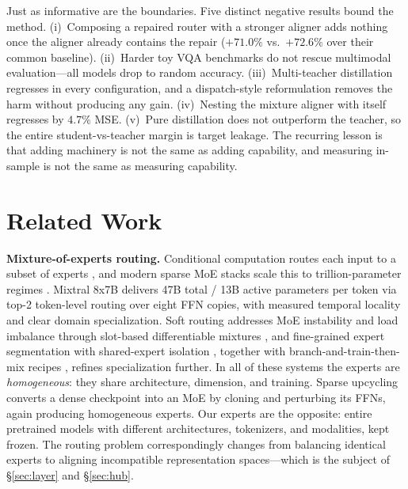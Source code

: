 \documentclass[10pt,twoside]{article}
\theoremstyle{definition}
\theoremstyle{plain}
\theoremstyle{remark}
\begin{document}
Just as informative are the boundaries. Five distinct negative results bound the method. (i)~Composing a repaired router with a stronger aligner adds nothing once the aligner already contains the repair ($+71.0\%$ vs.\ $+72.6\%$ over their common baseline). (ii)~Harder toy VQA benchmarks do not rescue multimodal evaluation---all models drop to random accuracy. (iii)~Multi-teacher distillation regresses in every configuration, and a dispatch-style reformulation removes the harm without producing any gain. (iv)~Nesting the mixture aligner with itself regresses by $4.7\%$ MSE. (v)~Pure distillation does not outperform the teacher, so the entire student-vs-teacher margin is target leakage. The recurring lesson is that adding machinery is not the same as adding capability, and measuring in-sample is not the same as measuring capability.

\section{Related Work}
\label{sec:related}

\textbf{Mixture-of-experts routing.} Conditional computation routes each input to a subset of experts \citep{jacobs1991,shazeerOutrageouslyLargeNeural2017}, and modern sparse MoE stacks scale this to trillion-parameter regimes \citep{fedus2022,zoph2022}. Mixtral 8x7B \citep{jiang2024mixtral} delivers 47B total / 13B active parameters per token via top-2 token-level routing over eight FFN copies, with measured temporal locality and clear domain specialization. Soft routing addresses MoE instability and load imbalance through slot-based differentiable mixtures \citep{puigcerver2024softmoe}, and fine-grained expert segmentation with shared-expert isolation \citep{dai2024}, together with branch-and-train-then-mix recipes \citep{sukhbaatar2024btx}, refines specialization further. In all of these systems the experts are \emph{homogeneous}: they share architecture, dimension, and training. Sparse upcycling \citep{komatsuzaki2023} converts a dense checkpoint into an MoE by cloning and perturbing its FFNs, again producing homogeneous experts. Our experts are the opposite: entire pretrained models with different architectures, tokenizers, and modalities, kept frozen. The routing problem correspondingly changes from balancing identical experts to aligning incompatible representation spaces---which is the subject of \S\ref{sec:layer} and \S\ref{sec:hub}.
\end{document}
